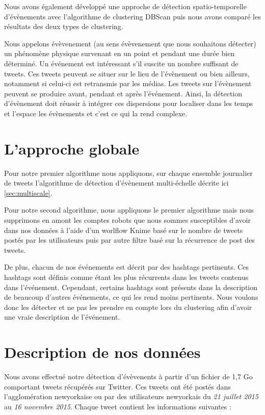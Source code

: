 \documentclass[12pt]{article}
\begin{document}
Nous avons \'egalement d\'evelopp\'e une approche de d\'etection spatio-temporelle d'\'ev\`enements avec l'algorithme de clustering DBScan puis nous avons compar\'e les r\'esultats des deux types de clustering.

Nous appelons \'ev\`evenement (au sens \'ev\`evenement que nous souhaitons d\'etecter) un ph\'enom\`ene physique survenant en un point et pendant une dur\'ee bien d\'etermin\'e. Un \'ev\'enement est int\'eressant s'il suscite un nombre suffisant de tweets. Ces tweets peuvent se situer sur le lieu de l'\'ev\`enement ou bien ailleurs, notamment si celui-ci est retransmis par les m\'edias. Les tweets sur l'\'ev\`enement peuvent se produire avant, pendant et apr\`es l'\'ev\'enement. Ainsi, la d\'etection d'\'ev\`enement doit r\'eussir \`a int\'egrer ces dispersions pour localiser dans les temps et l'espace les \'ev\`enements et c'est ce qui la rend complexe.


\section{L'approche globale}

Pour notre premier algorithme nous appliquons, sur chaque ensemble journalier de tweets l'algorithme de d\'etection d'\'ev\`enement multi-\'echelle décrite ici \autoref{sec:multiscale}.

Pour notre second algorithme, nous appliquons le premier algorithme mais nous supprimons en amont les comptes robots
que nous sommes susceptibles d'avoir dans nos donn\'ees \`a l'aide d'un worlflow Knime bas\'e sur le nombre de tweets post\'es par les utilisateurs puis par autre filtre bas\'e sur la r\'ecurrence de post des tweets. 

De plus, chacun de nos \'ev\'enements est d\'ecrit par des hashtags pertinents. Ces hashtags sont d\'efinis comme \'etant les plus r\'ecurrents dans les tweets contenus dans l'\'ev\'enement. Cependant, certains hashtags sont pr\'esents dans la description de
beaucoup d'autres \'ev\'enements, ce qui les rend moins pertinents. Nous voulons donc les d\'etecter et ne pas les prendre en compte lors du clustering afin d'avoir une vraie description de l'\'ev\'enement.


\section{Description de nos donn\'ees}
\label{sec:desc_donnees}

Nous avons effectu\'e notre d\'etection d'\'ev\`evenents \`a partir d'un fichier de 1,7 Go comportant  tweets  r\'ecup\'er\'es sur Twitter. Ces tweets ont \'et\'e post\'es dans l'agglom\'eration newyorkaise ou par des utilisateurs newyorkais du \textit{21 juillet 2015} au \textit{16 novembre 2015}. Chaque tweet contient les informations suivantes :
\end{document}
